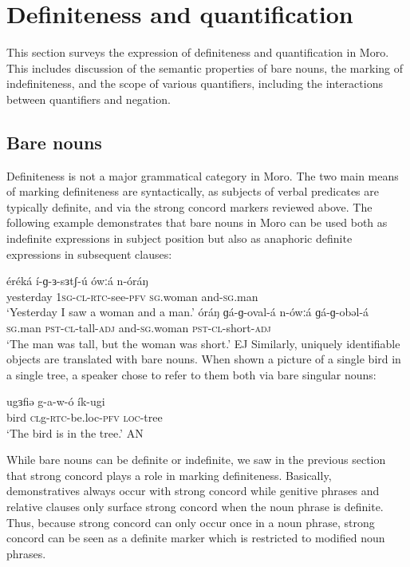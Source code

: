 \section{Definiteness and quantification}%

This section surveys the expression of definiteness and quantification in Moro. This includes discussion of the semantic properties of bare nouns, the marking of indefiniteness, and the scope of various quantifiers, including the interactions between quantifiers and negation.

\subsection{Bare nouns}\label{section:baren}

Definiteness is not a major grammatical category in Moro. The two main means of marking definiteness are syntactically, as subjects of verbal predicates are typically definite, and via the strong concord markers reviewed above. The following example demonstrates that bare nouns in Moro can be used both as indefinite expressions in subject position but also as anaphoric definite expressions in subsequent clauses:

\ea 
	\ea \gll	éréká	í-ɡ-ɜ-sɜtʃ-ú		ówːá		n-óráŋ \\
		yesterday 	1\textsc{sg}-\textsc{cl}-\textsc{rtc}-see-\textsc{pfv} 	\textsc{sg}.woman 	and-\textsc{sg}.man\\
		\glt	‘Yesterday I saw a woman and a man.’ \label{indefbaren}
	\ex \gll	óráŋ 	ɡá-ɡ-oval-á	n-ówːá		ɡá-ɡ-obəl-á\\
		\textsc{sg}.man 	\textsc{pst}-\textsc{cl}-tall-\textsc{adj}	and-\textsc{sg}.woman 	\textsc{pst}-\textsc{cl}-short-\textsc{adj}\\
		\glt ‘The man was tall, but the woman was short.’ \hfill EJ
	\z
\z 
Similarly, uniquely identifiable objects are translated with bare nouns. When shown a picture of a single bird in a single tree, a speaker chose to refer to them both via bare singular nouns: 

\ea \gll  ugɜfiə g-a-w-ó ík-ugi		\\
		   bird  \textsc{cl}g-\textsc{rtc}-be.loc-\textsc{pfv} \textsc{loc}-tree\\
	\glt ‘The bird is in the tree.’  \hfill AN
\z 

While bare nouns can be definite or indefinite, we saw in the previous section that strong concord plays a role in marking definiteness. Basically, demonstratives always occur with strong concord while genitive phrases and relative clauses only surface strong concord when the noun phrase is definite. Thus, because strong concord can only occur once in a noun phrase, strong concord can be seen as a definite marker which is restricted to modified noun phrases.

